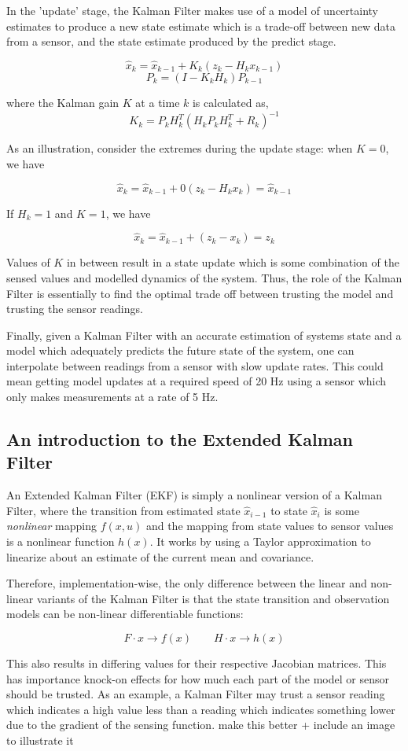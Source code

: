 In the 'update' stage, the Kalman Filter makes use of a model of uncertainty estimates to produce a new state estimate which is a trade-off between new data from a sensor, and the state estimate produced by the predict stage.

\[ \hat{x}_k = \hat{x}_{k-1} + K_k (z_k - H_k x_{k-1}) \]
\[ P_k = (I - K_k H_k) P_{k-1} \]

where the Kalman gain $K$ at a time $k$ is calculated as,
\[ K_k = P_k H_k^T (H_k P_k H_k^T + R_k)^{-1} \]

As an illustration, consider the extremes during the update stage: when $K = 0$, we have

\[ \hat{x}_k = \hat{x}_{k-1} + 0 (z_k - H_k x_k) = \hat{x}_{k-1} \]

If $H_k = 1$ and $K = 1$, we have

\[ \hat{x}_k = \hat{x}_{k-1} + (z_k - x_k) = z_k \]

Values of $K$ in between result in a state update which is some combination of the sensed values and modelled dynamics of the system. Thus, the role of the Kalman Filter is essentially to find the optimal trade off between trusting the model and trusting the sensor readings.

Finally, given a Kalman Filter with an accurate estimation of systems state and a model which adequately predicts the future state of the system, one can interpolate between readings from a sensor with slow update rates. This could mean getting model updates at a required speed of 20 Hz using a sensor which only makes measurements at a rate of 5 Hz.



\subsection{An introduction to the Extended Kalman Filter}
An Extended Kalman Filter (EKF) is simply a nonlinear version of a Kalman Filter, where the transition from estimated state $\hat{x}_{i-1}$ to state $\hat{x}_i$ is some \emph{nonlinear} mapping $f(x, u)$ and the mapping from state values to sensor values is a nonlinear function $h(x)$. It works by using a Taylor approximation to linearize about an estimate of the current mean and covariance.

Therefore, implementation-wise, the only difference between the linear and non-linear variants of the Kalman Filter is that the state transition and observation models can be non-linear differentiable functions:

\[ F \cdot x \rightarrow f(x) \qquad H\cdot x \rightarrow h(x) \]

This also results in differing values for their respective Jacobian matrices. This has importance knock-on effects for how much each part of the model or sensor should be trusted. As an example, a Kalman Filter may trust a sensor reading which indicates a high value less than a reading which indicates something lower due to the gradient of the sensing function. {\color{red} make this better + include an image to illustrate it}
